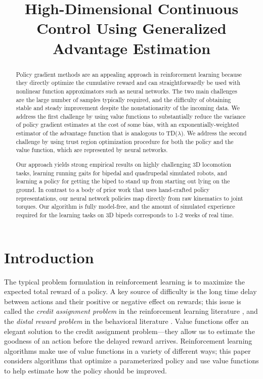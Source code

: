 \title{High-Dimensional Continuous Control Using Generalized Advantage Estimation}

\begin{abstract}
Policy gradient methods are an appealing approach in reinforcement learning because they directly optimize the cumulative reward and can straightforwardly be used with nonlinear function approximators such as neural networks. The two main challenges are the large number of samples typically required, and  the difficulty of obtaining stable and steady improvement despite the nonstationarity of the incoming data. We address the first challenge by using value functions to substantially reduce the variance of policy gradient estimates at the cost of some bias, with an exponentially-weighted estimator of the advantage function that is analogous to TD($\lambda$).
We address the second challenge by using trust region optimization procedure for both the policy and the value function, which are represented by neural networks.

Our approach yields strong empirical results on highly challenging 3D locomotion tasks, learning running gaits for bipedal and quadrupedal simulated robots, and learning a policy for getting the biped to stand up from starting out lying on the ground. In contrast to a body of prior work that uses hand-crafted policy representations, our neural network policies map directly from raw kinematics to joint torques. Our algorithm is fully model-free, and the amount of simulated experience required for the learning tasks on 3D bipeds corresponds to 1-2 weeks of real time.
\end{abstract}

\section{Introduction}

The typical problem formulation in reinforcement learning is to maximize the expected total reward of a policy. A key source of difficulty is the long time delay between actions and their positive or negative effect on rewards; this issue is called the \textit{credit assignment problem} in the reinforcement learning literature \citep{minsky1961steps,sutton1998introduction}, and the \textit{distal reward problem} in the behavioral literature \citep{hull1943principles}. Value functions offer an elegant solution to the credit assignment problem---they allow us to estimate the goodness of an action before the delayed reward arrives. Reinforcement learning algorithms make use of value functions in a variety of different ways; this paper considers algorithms that optimize a parameterized policy and use value functions to help estimate how the policy should be improved.

